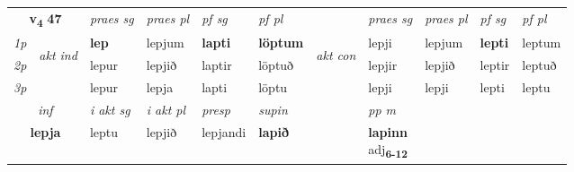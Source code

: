 \noindent
\begin{tabular}{lllllllllll} \toprule
\multicolumn{2}{c}{\textbf{v{\textsubscript{4}}} \Large{\textbf{47}}}  &  \textit{praes sg}  & \textit{praes pl}  &\textit{ pf sg} & \textit{pf pl} &  &  \textit{praes sg}  & \textit{praes pl}  & \textit{pf sg} & \textit{pf pl } \\*
	\cmidrule{3-6} \cmidrule{8-11}
 {\textit{1p}} & \multirow{3}{*}{\begin{turn}{90}\textit{akt ind}\end{turn}} & \textbf{lep} & lepjum & \textbf{lapti} & \textbf{löptum} & \multirow{3}{*}{\begin{turn}{90}\textit{akt con}\end{turn}} &lepji & lepjum & \textbf{lepti} & leptum\\*
 {\textit{2p}} &  &  lepur  & lepjið & laptir & löptuð & & lepjir & lepjið & leptir & leptuð \\*
{\textit{3p}} &  & lepur & lepja & lapti & löptu & & lepji & lepji& lepti & leptu \\*
\cmidrule{3-6} \cmidrule{8-11}

   \multicolumn{2}{c}{\textit{inf}}  & \textit{i akt sg} & \textit{i akt pl}   & \textit{presp} & \textit{supin}  && \textit{pp m} \\*
  \multicolumn{2}{c}{\textbf{lepja}} & leptu  & lepjið   & lepjandi &  \textbf{lapið}  && \specialcell{\textbf{lapinn} \\ adj\textbf{\textsubscript{6-12}}} \\*
\end{tabular}

